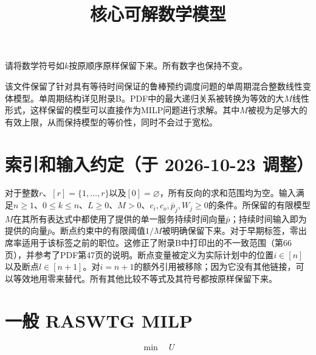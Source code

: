 \documentclass{article}
\title{核心可解数学模型}
\author{}
\date{}
\begin{document}
\maketitle

请将数学符号如\(k\)按原顺序原样保留下来。所有数字也保持不变。

该文件保留了针对具有等待时间保证的鲁棒预约调度问题的单周期混合整数线性变体模型。单周期结构详见附录B。PDF中的最大递归关系被转换为等效的大\(M\)线性形式，这样保留的模型可以直接作为MILP问题进行求解。其中\(M\)被视为足够大的有效上限，从而保持模型的等价性，同时不会过于宽松。


\section*{索引和输入约定（于 2026-10-23 调整）}
对于整数$r$、$[r]=\{1,\ldots,r\}$以及$[0]=\varnothing$，所有反向的求和范围均为空。输入满足$n\ge1$、$0\le k\le n$、$L\ge0$、$M>0$、$c_i,c_o,\bar p_j,W_j\ge0$的条件。所保留的有限模型$M$在其所有表达式中都使用了提供的单一服务持续时间向量$\bar p$；持续时间输入即为提供的向量$\bar p$。断点约束中的有限阈值$1/M$被明确保留下来。对于早期标签，零出席率适用于该标签之前的职位。这修正了附录B中打印出的不一致范围（第66页），并参考了PDF第47页的说明。断点变量被定义为实际计划中的位置$i\in[n]$以及断点$l\in[n+1]$。对$i=n+1$的额外引用被移除；因为它没有其他链接，可以等效地用零来替代。所有其他比较不等式及其符号都按原样保留下来。

\section{一般 RASWTG MILP}

\begin{equation}
\min \quad U
\tag{58}
\end{equation}
\end{document}
